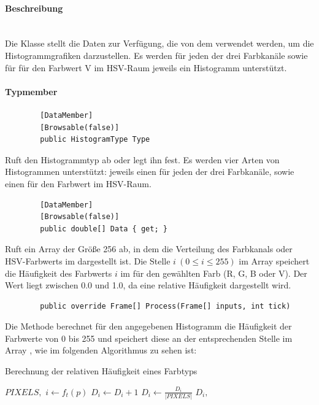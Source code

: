 \paragraph{Beschreibung}~\\
Die Klasse  stellt die Daten zur Verfügung, die von dem  verwendet werden, um die Histogrammgrafiken darzustellen. Es werden für jeden der drei Farbkanäle sowie für für den Farbwert V im HSV-Raum jeweils ein Histogramm unterstützt.

\paragraph{Typmember}
\begin{itemize}
	\begin{verbatim}
		[DataMember]
		[Browsable(false)]
		public HistogramType Type
	\end{verbatim}
	Ruft den Histogrammtyp ab oder legt ihn fest. Es werden vier Arten von Histogrammen unterstützt: jeweils einen für jeden der drei Farbkanäle, sowie einen für den Farbwert im HSV-Raum.
	
	\begin{verbatim}
		[DataMember]
		[Browsable(false)]
		public double[] Data { get; }
	\end{verbatim}
	Ruft ein Array der Größe 256 ab, in dem die Verteilung des Farbkanals oder HSV-Farbwerts im  dargestellt ist. Die Stelle $ i \ (0 \leq i \leq 255) $ im Array speichert die Häufigkeit des Farbwerts $ i $ im  für den gewählten Farb (R, G, B oder V). Der Wert liegt zwischen 0.0 und 1.0, da eine relative Häufigkeit dargestellt wird.

	\begin{verbatim}
		public override Frame[] Process(Frame[] inputs, int tick)
	\end{verbatim}
	Die Methode  berechnet für den angegebenen Histogramm die Häufigkeit der Farbwerte von 0 bis 255 und speichert diese an der entsprechenden Stelle im Array , wie im folgenden Algorithmus zu sehen ist:
	\begin{algorithm}[H]
		\caption{Berechnung der relativen Häufigkeit eines Farbtyps}
		\begin{algorithmic}[1]
			\REQUIRE $ PIXELS, $ 
			\STATE {}
				\STATE $ i \gets f_{t}(p) $
				\STATE $ D_i \gets D_i + 1 $
			\ENDFOR
				\STATE $ D_i \gets \frac{D_i}{|PIXELS|} $
			\ENDFOR
			\ENSURE $ D_i, $ 
		\end{algorithmic}
	\end{algorithm}

\end{itemize}

